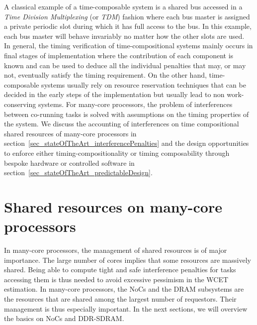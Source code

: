 \documentclass[main.tex]{subfiles}
\begin{document}
A classical example of a time-composable system is a shared bus accessed in a \emph{Time Division Multiplexing} (or \emph{TDM}) fashion where each bus master is assigned a private periodic slot during which it has full access to the bus. In this example, each bus master will behave invariably no matter how the other slots are used.\\


In general, the timing verification of time-compositional systems mainly occurs in final stages of implementation where the contribution of each component is known and can be used to deduce all the individual penalties that may, or may not, eventually satisfy the timing requirement. On the other hand, time-composable systems usually rely on resource reservation techniques that can be decided in the early steps of the implementation but usually lead to non work-conserving systems. For many-core processors, the problem of interferences between co-running tasks is solved with assumptions on the timing properties of the system. We discuss the accounting of interferences on time compositional shared resources of many-core processors in section~\ref{sec_stateOfTheArt_interferencePenalties} and the design opportunities to enforce either timing-compositionality or timing composability through bespoke hardware or controlled software in section~\ref{sec_stateOfTheArt_predictableDesign}.



\section{Shared resources on many-core processors}
\label{sec_stateOfTheArt_accountInterferences}

In many-core processors, the management of shared resources is of major importance. The large number of cores implies that some resources are massively shared. Being able to compute tight and safe interference penalties for tasks accessing them is thus needed to avoid excessive pessimism in the WCET estimation. In many-core processors, the NoCs and the DRAM subsystems are the resources that are shared among the largest number of requestors. Their management is thus especially important.
In the next sections, we will overview the basics on NoCs and DDR-SDRAM. 
\end{document}
